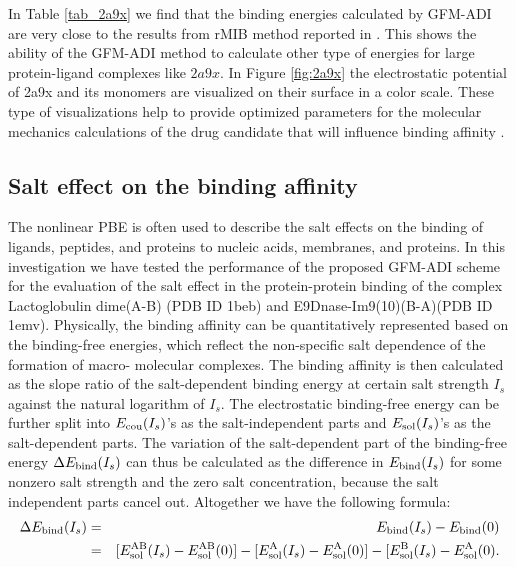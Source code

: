 In Table \ref{tab_2a9x} we find that the binding energies calculated by GFM-ADI are very close to the results from rMIB method reported in \cite{Geng2017a}. This shows the ability of the GFM-ADI method to calculate other type of energies for large protein-ligand complexes like $2a9x$. In Figure \ref{fig:2a9x} the electrostatic potential of 2a9x and its monomers are visualized on their surface in a color scale. These type of visualizations help to provide optimized parameters for the molecular mechanics calculations of the drug candidate that will influence binding affinity \cite{drug2012}.      




\subsection{Salt effect on the binding affinity}
The nonlinear PBE is often used to describe the salt effects on the binding of ligands, peptides, and proteins to nucleic acids, membranes, and proteins. In this investigation we have tested the performance of the proposed GFM-ADI scheme for the evaluation of the salt effect in the protein-protein binding of the complex Lactoglobulin dime(A-B) (PDB ID 1beb) and E9Dnase-Im9(10)(B-A)(PDB ID 1emv). Physically, the binding affinity can be quantitatively represented based on the binding-free energies, which reflect the non-specific salt dependence of the formation of macro- molecular complexes. The binding affinity is then calculated as the slope ratio of the salt-dependent binding energy at certain salt strength $I_s$ against the natural logarithm of $I_s$.
The electrostatic binding-free energy can be further split into $E_{\rm cou}(I_s)$'s as the salt-independent parts and $E_{\rm sol}(I_s)$'s as the salt-dependent parts. The variation of the salt-dependent part of the binding-free energy $\Delta E_{\rm bind}(I_s)$ can thus be calculated as the difference in $E_{\rm bind}(I_s)$ for some nonzero salt strength and the zero salt concentration, because the salt independent parts cancel out. Altogether we have the following formula:
\begin{eqnarray}
	\Delta E_{\rm bind}(I_s) &=& E_{\rm bind}(I_s)- E_{\rm bind}(0)\label{eq_del_e_bind} \nonumber\\
						 &=& [E_{\rm sol}^{\rm AB}(I_s)-E_{\rm sol}^{\rm AB}(0)]-[E_{\rm sol}^{\rm A}(I_s)-E_{\rm sol}^{\rm A}(0)]- [E_{\rm sol}^{\rm B}(I_s)-E_{\rm sol}^{\rm A}(0).
\end{eqnarray}
						 
